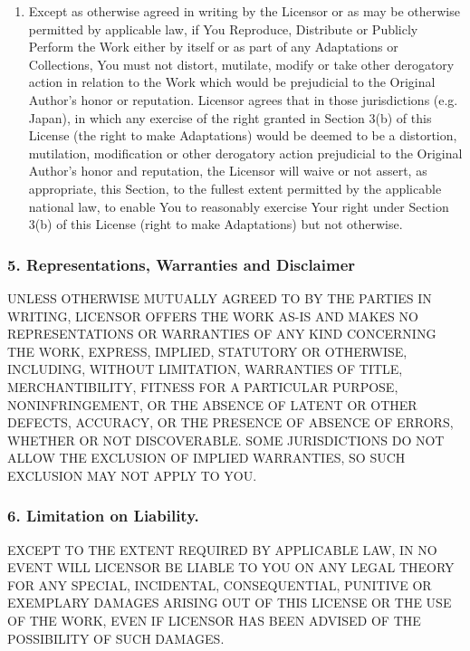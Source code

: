 \begin{enumerate}
          \item Except as otherwise agreed in writing by the Licensor
          or as may be otherwise permitted by applicable law, if
          You Reproduce, Distribute or Publicly Perform the Work
          either by itself or as part of any Adaptations or
          Collections, You must not distort, mutilate, modify or
          take other derogatory action in relation to the Work
          which would be prejudicial to the Original Author's honor
          or reputation. Licensor agrees that in those
          jurisdictions (e.g. Japan), in which any exercise of the
          right granted in Section 3(b) of this License (the right
          to make Adaptations) would be deemed to be a distortion,
          mutilation, modification or other derogatory action
          prejudicial to the Original Author's honor and
          reputation, the Licensor will waive or not assert, as
          appropriate, this Section, to the fullest extent
          permitted by the applicable national law, to enable You
          to reasonably exercise Your right under Section 3(b) of
          this License (right to make Adaptations) but not
          otherwise.

\end{enumerate}

        \subsubsection{5. Representations, Warranties and
        Disclaimer}

        UNLESS OTHERWISE MUTUALLY AGREED TO BY THE PARTIES IN
        WRITING, LICENSOR OFFERS THE WORK AS-IS AND MAKES NO
        REPRESENTATIONS OR WARRANTIES OF ANY KIND CONCERNING THE
        WORK, EXPRESS, IMPLIED, STATUTORY OR OTHERWISE, INCLUDING,
        WITHOUT LIMITATION, WARRANTIES OF TITLE, MERCHANTIBILITY,
        FITNESS FOR A PARTICULAR PURPOSE, NONINFRINGEMENT, OR THE
        ABSENCE OF LATENT OR OTHER DEFECTS, ACCURACY, OR THE
        PRESENCE OF ABSENCE OF ERRORS, WHETHER OR NOT DISCOVERABLE.
        SOME JURISDICTIONS DO NOT ALLOW THE EXCLUSION OF IMPLIED
        WARRANTIES, SO SUCH EXCLUSION MAY NOT APPLY TO YOU.

        \subsubsection{6. Limitation on Liability.} EXCEPT TO
        THE EXTENT REQUIRED BY APPLICABLE LAW, IN NO EVENT WILL
        LICENSOR BE LIABLE TO YOU ON ANY LEGAL THEORY FOR ANY
        SPECIAL, INCIDENTAL, CONSEQUENTIAL, PUNITIVE OR EXEMPLARY
        DAMAGES ARISING OUT OF THIS LICENSE OR THE USE OF THE WORK,
        EVEN IF LICENSOR HAS BEEN ADVISED OF THE POSSIBILITY OF
        SUCH DAMAGES.


